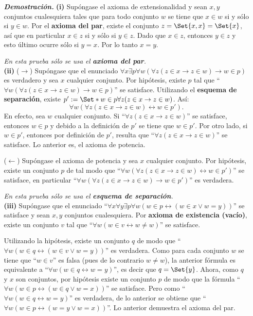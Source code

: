 \documentclass[12pt]{article}
\providecommand\given{}
\newcounter{A}
\begin{document}
    \textbf{\textit{Demostración.}} \textbf{(i)} Supóngase el axioma de extensionalidad y sean \(x,y\) conjuntos cualesquiera tales que para todo conjunto \(w\) se tiene que \(x \in w\) si y sólo si \(y \in w\). Por el \textbf{axioma del par}, existe el conjunto $z=\Set{x,x}=\Set{x}$, así que en particular $x \in z$ si y sólo si $y \in z$. Dado que $x \in z$, entonces $y \in z$ y esto último ocurre sólo si $y=x$. Por lo tanto $x=y$.
    
    \hfill \textit{En esta prueba sólo se usa el \textbf{axioma del par}.} \\

    \textbf{(ii)} (\(\rightarrow\)) Supóngase que el enunciado \(\forall x \exists p \forall w ( \forall z ( z \in x \to z \in w) \rightarrow w \in p )\) es verdadero y sea \(x\) cualquier conjunto. Por hipótesis, existe \(p\) tal que ``\(\forall w ( \forall z ( z \in x \to z \in w) \rightarrow w \in p )\)'' se satisface. Utilizando el \textbf{esquema de separación}, existe  \(p':=\Set*{ w \in p \given \forall z ( z \in x \to z \in w) } \). Así:
    \[ \forall w ( \forall z ( z \in x \to z \in w) \leftrightarrow w \in p' ). \]
    En efecto, sea \(w\) cualquier conjunto. Si ``\(\forall z ( z \in x \to z \in w)\)'' se satisface, entonces \(w \in p\) y debido a la definición de \(p'\) se tiene que \(w \in p'\). Por otro lado, si \(w \in p'\), entonces por definición de \(p'\), resulta que ``\(\forall z ( z \in x \to z \in w)\)'' se satisface. Lo anterior es, el axioma de potencia.

    (\(\leftarrow\)) Supóngase el axioma de potencia y sea \(x\) cualquier conjunto. Por hipótesis, existe un conjunto \(p\) de tal modo que ``\(\forall w ( \forall z ( z \in x \to z \in w) \leftrightarrow w \in p' )\)'' se satisface, en particular ``\(\forall w ( \forall z ( z \in x \to z \in w) \rightarrow w \in p' )\)'' es verdadera.

    \hfill \textit{En esta prueba sólo se usa el \textbf{esquema de separación}.} \\

    \textbf{(iii)} Supóngase que el enunciado ``\( \forall x \forall y \exists p \forall w ( w \in p \leftrightarrow (w \in x \lor w=y ) ) \)'' se satisface y sean \(x,y\) conjuntos cualesquiera. Por \textbf{axioma de existencia (vacío)}, existe un conjunto \(v\) tal que ``\(\forall w (w \in v \leftrightarrow w \neq w)\)'' se satisface.
    
    Utilizando la hipótesis, existe un conjunto \(q\) de modo que ``\(\forall w ( w \in q \leftrightarrow (w \in v \lor w=y ) )\)'' es verdadera. Como para cada conjunto \(w\) se tiene que ``\(w \in v\)'' es falsa (pues de lo contrario \(w \neq w\)), la anterior fórmula es equivalente a ``\(\forall w ( w \in q \leftrightarrow w=y )\)'', es decir que \(q=\Set{y}\). Ahora, como \(q\) y \(x\) son conjuntos, por hipótesis existe un conjunto \(p\) de modo que la fórmula ``\(\forall w ( w \in p \leftrightarrow (w \in q \lor w=x ) )\)'' se satisface. Pero como ``\(\forall w ( w \in q \leftrightarrow w=y )\)'' es verdadera, de lo anterior se obtiene que ``\(\forall w ( w \in p \leftrightarrow (w=y \lor w=x ) )\)''. Lo anterior demuestra el axioma del par.
\end{document}
